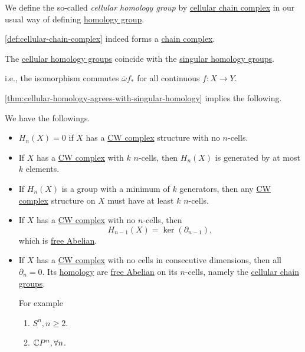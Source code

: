 \begin{definition}\label{def:cellular-homology-group}
	We define the so-called \emph{cellular homology group} by \hyperref[def:cellular-chain-complex]{cellular chain complex} in our usual way of defining
	\hyperref[def:homology-group]{homology group}.
\end{definition}

\begin{theorem}
	\autoref{def:cellular-chain-complex} indeed forms a \hyperref[def:chain-complex]{chain complex}.
\end{theorem}

\begin{theorem}\label{thm:cellular-homology-agrees-with-singular-homology}
	The \hyperref[def:cellular-homology-group]{cellular homology groups} coincide with the \hyperref[def:singular-homology-group]{singular homology groups}.
\end{theorem}
\begin{note}
	i.e., the isomorphism commutes \(\overline{\omega} f_\ast\) for all continuous \(f\colon X\to Y\).
\end{note}

\autoref{thm:cellular-homology-agrees-with-singular-homology} implies the following.
\begin{corollary}
	We have the followings.
	\begin{itemize}
		\item \(H_n(X) = 0\) if \(X\) has a \hyperref[def:CW-Complex]{CW complex} structure with no \(n\)-cells.
		\item If \(X\) has a \hyperref[def:CW-Complex]{CW complex} with \(k\) \(n\)-cells, then \(H_n(X)\) is generated by at most \(k\) elements.
		\item If \(H_n(X)\) is a group with a minimum of \(k\) generators, then any \hyperref[def:CW-Complex]{CW complex} structure on \(X\) must have at least \(k\) \(n\)-cells.
		\item If \(X\) has a \hyperref[def:CW-Complex]{CW complex} with no \(n\)-cells, then
		      \[
			      H_{n-1}(X) = \ker (\partial _{n-1}),
		      \]
		      which is \hyperref[def:free-Abelian-group]{free Abelian}.
		\item If \(X\) has a \hyperref[def:CW-Complex]{CW complex} with no cells in consecutive dimensions, then all \(\partial _n=0\).
		      Its \hyperref[def:cellular-homology-group]{homology} are \hyperref[def:free-Abelian-group]{free Abelian} on its \(n\)-cells,
		      namely the \hyperref[def:cellular-chain-complex]{cellular chain groups}.
		      \par For example
		      \begin{enumerate}
			      \item \(S^n, n \geq 2\).
			      \item \(\mathbb{\MakeUppercase{c}} P^n, \forall n\).
		      \end{enumerate}
	\end{itemize}
\end{corollary}

